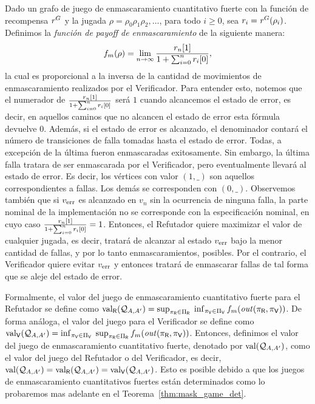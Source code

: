 Dado un grafo de juego de enmascaramiento cuantitativo fuerte con la función de recompensa $\reward^G$ y la jugada 
$\rho = \rho_0 \rho_1 \rho_2, \ldots$, para todo $i \geq 0$, sea 
$r_i = \reward^G(\rho_i)$.
Definimos la \emph{función de payoff de enmascaramiento} de la siguiente manera: 
\[%
\FMask(\rho) = \lim_{n \rightarrow \infty}  \frac{\pr{1}{r_n}}{1+ \sum^{n}_{i=0} \pr{0}{r_i}},
\]
la cual es proporcional a la inversa de la cantidad de movimientos de enmascaramiento realizados por el Verificador. Para entender esto, notemos que el numerador de $\frac{\pr{1}{r_n}}{1+ \sum^{n}_{i=0} \pr{0}{r_i}}$ será $1$
cuando alcancemos el estado de error, es decir, en aquellos caminos que no alcancen el estado de error esta fórmula devuelve $0$. Además, si el estado de error es alcanzado,  el denominador contará el número de transiciones de falla tomadas hasta el estado de error. Todas, a excepción de la última fueron enmascaradas exitosamente. Sin embargo, la última falla tratara de ser enmascarada por el Verificador, pero eventualmente llevará al estado de error.
Es decir, los vértices con valor $(1,\_)$ son aquellos correspondientes a fallas. Los demás se corresponden con $(0,\_)$.
Observemos también que si $\ErrorSt$ es alcanzado en $v_n$ sin la ocurrencia de ninguna falla, la parte nominal de la implementación no se corresponde con la especificación nominal, en cuyo caso $\frac{\pr{1}{r_n}}{1+ \sum^{n}_{i=0} \pr{0}{r_i}}=1$.
Entonces, el Refutador quiere maximizar el valor de cualquier jugada, es decir, tratará de alcanzar al estado $\ErrorSt$ bajo la menor cantidad de fallas, y por lo tanto enmascaramientos, posibles. 
Por el contrario, el Verificador quiere evitar $\ErrorSt$ y entonces tratará de enmascarar fallas de tal forma que se aleje del estado de error. 

Formalmente, el valor del juego de enmascaramiento cuantitativo fuerte para el Refutador se define como $\val_\Refuter(\QMStrGame) = \Sup_{\pi_\Refuter \in \Pi_\Refuter} \; \Inf_{\pi_\Verifier \in \Pi_\Verifier} \FMask(\out(\pi_\Refuter, \pi_\Verifier))$. De forma análoga, el valor del juego para el Verificador se define como $\val_\Verifier(\QMStrGame) = \Inf_{\pi_\Verifier \in \Pi_\Verifier} \; \Sup_{\pi_\Refuter \in \Pi_\Refuter} \FMask(\out(\pi_\Refuter, 
\pi_\Verifier))$. Entonces, definimos el valor del juego de enmascaramiento cuantitativo fuerte, denotado por $\val(\QMStrGame)$, como el valor del juego del Refutador o del Verificador, es decir, $\val(\QMStrGame) = \val_\Refuter(\QMStrGame) = \val_\Verifier(\QMStrGame)$. Esto es posible debido a que los juegos de enmascaramiento cuantitativos fuertes están determinados como lo probaremos mas adelante en el Teorema~\ref{thm:mask_game_det}. \\

